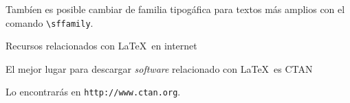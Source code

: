 \documentclass{article}
\begin{document}
Tambíen es posible cambiar de familia tipogáfica para textos más amplios
con el comando \texttt{\textbackslash sffamily}.

\sffamily Recursos relacionados con \LaTeX\ en internet

El mejor lugar para descargar \textit{software} relacionado con \LaTeX\ es CTAN

Lo encontrarás en \texttt{http://www.ctan.org}.
\end{document}
